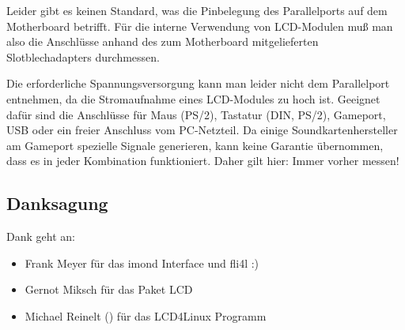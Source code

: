   Leider gibt es keinen Standard, was die Pinbelegung des Parallelports
  auf dem Motherboard betrifft. Für die interne Verwendung von LCD-Modulen
  muß man also die Anschlüsse anhand des zum Motherboard mitgelieferten
  Slotblechadapters durchmessen.

  Die erforderliche Spannungsversorgung kann man leider nicht dem Parallelport
  entnehmen, da die Stromaufnahme eines LCD-Modules zu hoch ist. Geeignet dafür
  sind die Anschlüsse für Maus (PS/2), Tastatur (DIN, PS/2), Gameport, USB oder ein
  freier Anschluss vom PC-Netzteil. Da einige Soundkartenhersteller am Gameport
  spezielle Signale generieren, kann keine Garantie übernommen, dass es in jeder
  Kombination funktioniert. Daher gilt hier: Immer vorher messen!


\subsection{Danksagung}

  Dank geht an:

  \begin{itemize}
  \item Frank Meyer für das imond Interface und fli4l :)
   
  \item Gernot Miksch für das Paket LCD
   
  \item Michael Reinelt () für 
        das LCD4Linux Programm
  \end{itemize}

